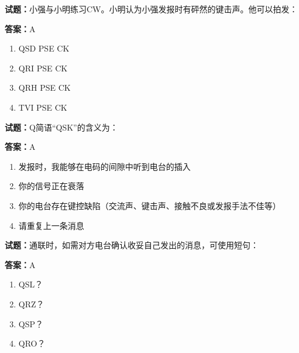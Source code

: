 \documentclass{ctexbook}
\begin{document}




\vspace{1em}

\textbf{试题：}小强与小明练习CW。小明认为小强发报时有砰然的键击声。他可以拍发： 

\textbf{答案：}A 


\begin{enumerate}[leftmargin=3em]
  \item QSD PSE CK 

  \item QRI PSE CK 

  \item QRH PSE CK 

  \item TVI PSE CK 

\end{enumerate}





\vspace{1em}

\textbf{试题：}Q简语“QSK”的含义为： 

\textbf{答案：}A 

\begin{enumerate}[leftmargin=3em]
  \item 发报时，我能够在电码的间隙中听到电台的插入 

  \item 你的信号正在衰落 

  \item 你的电台存在键控缺陷（交流声、键击声、接触不良或发报手法不佳等） 

  \item 请重复上一条消息 

\end{enumerate}





\vspace{1em}

\textbf{试题：}通联时，如需对方电台确认收妥自己发出的消息，可使用短句： 

\textbf{答案：}A 

\begin{enumerate}[leftmargin=3em]
  \item QSL？ 

  \item QRZ？ 

  \item QSP？ 

  \item QRO？ 

\end{enumerate}
\end{document}
